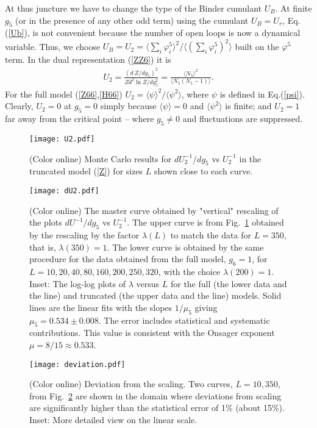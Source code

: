 \documentclass[prb,aps,twocolumn,groupedaddress,floats,showpacs,final]{revtex4}
\def\beq{\begin{eqnarray}}
\def\eeq{\end{eqnarray}}
\begin{document}
At thus juncture we have to change the type of the Binder cumulant $U_B$.
 At finite $g_5$ (or in the presence of any other odd term) using the cumulant $U_B=U_r$, Eq.(\ref{Ub}), is not convenient  because the number of open loops is now a dynamical variable. Thus, we choose
 $U_B=U_2= \langle \sum_i\varphi_i^5 \rangle^2/\langle (\sum_i\varphi_i^5)^2 \rangle $ built on the $\varphi^5$ term.
In the dual representation (\ref{ZZ6}) it is  %
\beq
U_2= \frac{(d\ Z/dg_5)^2}{Zd^2 \ln Z/dg^2_5}= \frac{\langle N_5 \rangle^2}{\langle N_5(N_5-1) \rangle}.
\label{U2}
\eeq     
For the full model (\ref{Z66},\ref{H66}) $U_2 =\langle \psi \rangle^2/\langle \psi^2 \rangle$, where $\psi $ is defined in Eq.(\ref{psi}).  
Clearly, $U_2=0$ at $g_5=0$ simply because $\langle \psi \rangle =0$ and $\langle \psi^2 \rangle$ is finite;  and $U_2=1$ far away from the critical point --  where  $g_5 \neq 0$ and fluctuations are suppressed. 
\begin{figure}
\vspace*{-0.5cm}
 \texttt{[image: U2.pdf]}
\caption{(Color online) Monte Carlo results for $dU^{-1}_2/dg_5$ vs  $U^{-1}_2$ in the truncated model (\ref{Z})  for sizes $L$ shown close to each curve.}
\label{fig:dU2}
\vskip-5mm
\end{figure}
\begin{figure}
 \texttt{[image: dU2.pdf]}
\vskip-8mm
\caption{(Color online) The master curve obtained by "vertical" rescaling of the plots $dU^{-1}/dg_5$ vs $U_2^{-1}$. The upper curve is from Fig.~\ref{fig:dU2} obtained by the rescaling by the factor $\lambda(L)$ to match the data for $L=350$, that is, $\lambda(350)=1$. The lower curve is obtained by the same procedure for the data obtained from the full model, $g_6=1$, for $L=10,20,40,80,160,200,250,320$, with the choice $\lambda(200)=1$.   Inset: The log-log plots of $\lambda$ versus $L$ for the full (the lower data and the line) and truncated (the upper data and the line) models. Solid lines are the linear fits  with the slopes  $1/\mu_5$ giving $\mu_5=0.534 \pm 0.008$. The error includes statistical and systematic contributions. This value is consistent with the Onsager exponent $\mu=8/15\approx 0.533$.  }
\label{fig:masterg5}
\vskip-5mm
\end{figure}
\begin{figure}
 \texttt{[image: deviation.pdf]}
\vskip-8mm
\caption{(Color online) Deviation from the scaling. Two curves, $L=10,350$, from Fig.~\ref{fig:masterg5} are shown in the domain where deviations from scaling are significantly higher than the statistical error of 1\% (about 15\%). Inset: More detailed view on the linear scale.}
\label{fig:deviation}
\vskip-5mm
\end{figure}
\end{document}
